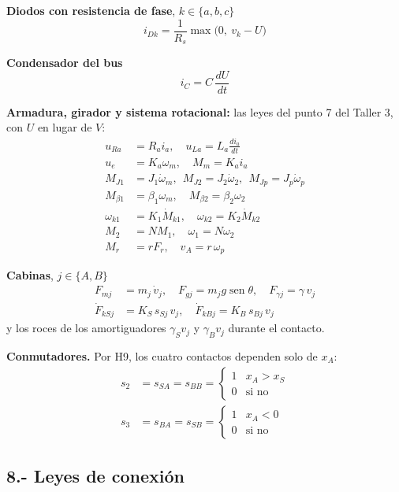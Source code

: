 \documentclass[10pt,a4paper,twocolumn]{article}
\DeclareMathOperator{\sen}{sen}
\begin{document}
\noindent\textbf{Diodos con resistencia de fase}, $k\in\{a,b,c\}$
\[
  i_{Dk} = \frac{1}{R_s}\max\big(0,\ v_k - U\big)
\]

\noindent\textbf{Condensador del bus}
\[
  i_C = C\,\frac{dU}{dt}
\]

\noindent\textbf{Armadura, girador y sistema rotacional:} las leyes del punto 7 del
Taller 3, con $U$ en lugar de $V$:
\begin{align*}
  u_{Ra} &= R_a i_a, \quad u_{La} = L_a \tfrac{di_a}{dt} \\
  u_e &= K_a\omega_m, \quad M_m = K_a i_a \\
  M_{J1} &= J_1\dot\omega_m,\ \ M_{J2} = J_2\dot\omega_2,\ \ M_{Jp} = J_p\dot\omega_p \\
  M_{\beta1} &= \beta_1\omega_m, \quad M_{\beta2} = \beta_2\omega_2 \\
  \omega_{k1} &= K_1 \dot M_{k1}, \quad \omega_{k2} = K_2 \dot M_{k2} \\
  M_2 &= N M_1, \quad \omega_1 = N\omega_2 \\
  M_r &= r F_r, \quad v_A = r\,\omega_p
\end{align*}

\noindent\textbf{Cabinas}, $j\in\{A,B\}$
\begin{align*}
  F_{mj} &= m_j\,\dot v_j, \quad F_{gj} = m_j g\sen\theta, \quad F_{\gamma j} = \gamma\,v_j \\
  \dot F_{kSj} &= K_S\,s_{Sj}\,v_j, \quad \dot F_{kBj} = K_B\,s_{Bj}\,v_j
\end{align*}
y los roces de los amortiguadores $\gamma_S v_j$ y $\gamma_B v_j$ durante el contacto.

\noindent\textbf{Conmutadores.} Por H9, los cuatro contactos dependen solo de $x_A$:
\begin{align*}
  s_2 &= s_{SA} = s_{BB} = \begin{cases} 1 & x_A > x_S \\ 0 & \text{si no} \end{cases} \\
  s_3 &= s_{BA} = s_{SB} = \begin{cases} 1 & x_A < 0 \\ 0 & \text{si no} \end{cases}
\end{align*}

\subsection*{8.- Leyes de conexión}
\end{document}
